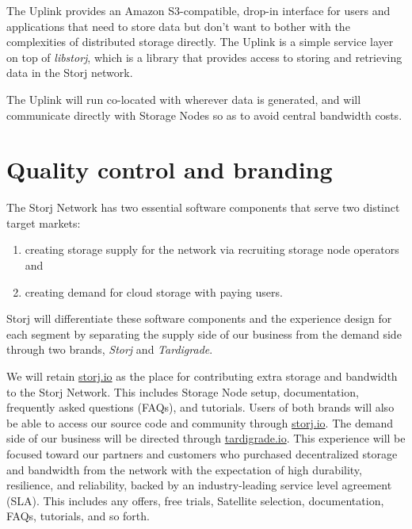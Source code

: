 \documentclass[8pt,fleqn,openany]{book}
\begin{document}
The Uplink provides an Amazon S3-compatible, drop-in interface for users and
applications that
need to store data but don't want to bother with the complexities of distributed
storage directly. The Uplink is a simple service layer on top of {\em libstorj},
which is a library that provides access to storing and retrieving data in the
Storj network.

The Uplink will run co-located with wherever data is generated, and will
communicate directly with Storage Nodes so as to avoid central bandwidth costs.

\section{Quality control and branding}\label{sec:qc}

The Storj Network has two essential software components that serve two distinct
target markets:

\begin{enumerate}
\item creating storage supply for the network via recruiting storage node
  operators and
\item creating demand for cloud storage with paying users.
\end{enumerate}

Storj will differentiate these software components and the experience design
for each segment by separating the supply side of our business from the
demand side through two brands, {\em Storj} and {\em Tardigrade}.

We will retain \url{storj.io} as the place for contributing extra storage and
bandwidth to the Storj Network. This includes Storage Node setup, documentation,
frequently asked questions (FAQs), and tutorials. Users of both brands will also be able to
access our source code and community through \url{storj.io}.
The demand side of our business will be directed through \url{tardigrade.io}.
This experience will be focused toward our partners and customers who purchased
decentralized storage and bandwidth from the network with the expectation of
high durability, resilience, and reliability, backed by an industry-leading
service level agreement (SLA). This includes any offers, free trials, Satellite
selection, documentation, FAQs, tutorials, and so forth.
\end{document}

